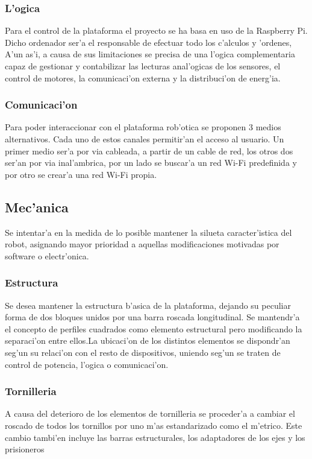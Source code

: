 \documentclass[twoside,12pt]{article}
\begin{document}
\subsubsection{L'ogica}
Para el control de la plataforma el proyecto se ha basa en uso de la Raspberry Pi. Dicho ordenador ser'a el responsable de efectuar todo los c'alculos y 'ordenes, A'un as'i, a causa de sus limitaciones se precisa de una l'ogica complementaria capaz de gestionar y contabilizar las lecturas anal'ogicas de los sensores, el control de motores, la comunicaci'on externa y la distribuci'on de energ'ia.

\subsubsection{Comunicaci'on}  
Para poder interaccionar con el plataforma rob'otica se proponen 3 medios alternativos. Cada uno de estos canales permitir'an el acceso al usuario. Un primer medio ser'a por via cableada, a partir de un cable de red, los otros dos ser'an por via inal'ambrica, por un lado se buscar'a un red Wi-Fi predefinida y por otro se crear'a una red Wi-Fi propia. 

\subsection{Mec'anica}
Se intentar'a en la medida de lo posible mantener la silueta caracter'istica del robot, asignando mayor prioridad a aquellas modificaciones motivadas por software o  electr'onica. 

\subsubsection{Estructura}
Se desea mantener la estructura b'asica de la plataforma, dejando su peculiar forma de dos bloques unidos por una barra roscada longitudinal. Se mantendr'a el concepto de perfiles cuadrados como elemento estructural pero modificando la separaci'on entre ellos.La ubicaci'on de los distintos elementos se dispondr'an seg'un su relaci'on con el resto de dispositivos, uniendo seg'un se traten de control de potencia, l'ogica o comunicaci'on.


\subsubsection{Tornilleria}
A causa del deterioro de los elementos de tornilleria se proceder'a a cambiar el roscado de todos los tornillos por uno m'as estandarizado como el m'etrico. Este cambio tambi'en incluye las barras estructurales, los adaptadores de los ejes y los prisioneros
\end{document}
